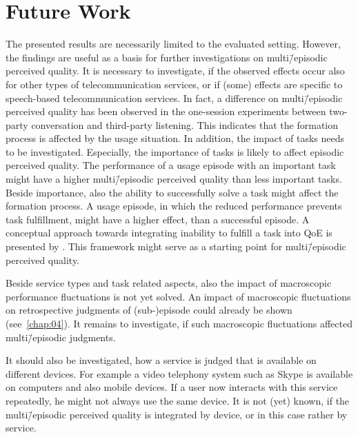 \section{Future Work}
The presented results are necessarily limited to the evaluated setting.
However, the findings are useful as a basis for further investigations on multi\=/episodic perceived quality.
It is necessary to investigate, if the observed effects occur also for other types of telecommunication services, or if (some) effects are specific to speech-based telecommunication services.
In fact, a difference on multi\=/episodic perceived quality has been observed in the one-session experiments between two-party conversation and third-party listening.
This indicates that the formation process is affected by the usage situation.
In addition, the impact of tasks needs to be investigated.
Especially, the importance of tasks is likely to affect episodic perceived quality.
The performance of a usage episode with an important task might have a higher multi\=/episodic perceived quality than less important tasks.
Beside importance, also the ability to successfully solve a task might affect the formation process.
A usage episode, in which the reduced performance prevents task fulfillment, might have a higher effect, than a successful episode.
A conceptual approach towards integrating inability to fulfill a task into \ac{QoE} is presented by \citet{leon-garcia_generalizing_2014}.
This framework might serve as a starting point for multi\=/episodic perceived quality.

Beside service types and task related aspects, also the impact of macroscopic performance fluctuations is not yet solved.
An impact of macroscopic fluctuations on retrospective judgments of (sub-)episode could already be shown (see~\autoref{chap:04}).
It remains to investigate, if such macroscopic fluctuations affected multi\=/episodic judgments.

It should also be investigated, how a service is judged that is available on different devices.
For example a video telephony system such as Skype is available on computers and also mobile devices.
If a user now interacts with this service repeatedly, he might not always use the same device.
It is not (yet) known, if the multi\=/episodic perceived quality is integrated by device, or in this case rather by service.